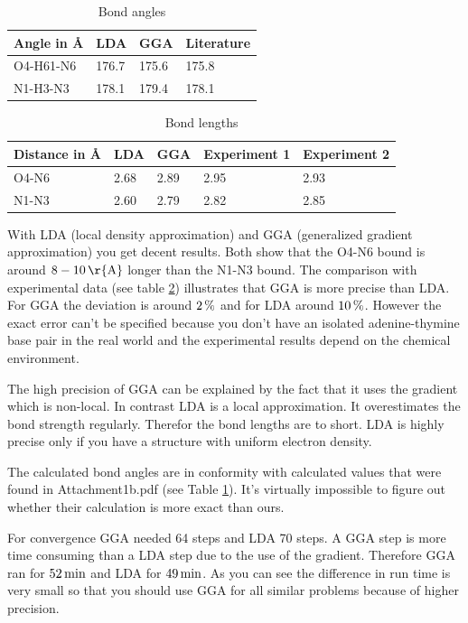 \documentclass[12pt,a4paper]{scrartcl}
\begin{document}
\begin{table}[H]
\begin{tabular}{l||l|l|l}
Angle in \r{A} & LDA & GGA & Literature \footnotemark[2]\\ 
\hline \hline 
O4-H61-N6 & 176.7 & 175.6 & 175.8\\ 
\hline 
N1-H3-N3 & 178.1 & 179.4 & 178.1\\ 
\end{tabular}
\caption{Bond angles}\label{tab:angles}
\end{table}

\begin{table}[H]
\begin{tabular}{l||l|l|l|l}
Distance in \r{A} & LDA & GGA & Experiment 1 \footnotemark[2] & Experiment 2 \footnotemark[2] \\ 
\hline \hline 
O4-N6 & 2.68 & 2.89 & 2.95 & 2.93 \\ 
\hline 
N1-N3 & 2.60 & 2.79 & 2.82 & 2.85 \\ 
\end{tabular}
\caption{Bond lengths}\label{tab:lengths}
\end{table}


With LDA (local density approximation) and GGA (generalized gradient approximation) you get decent results. Both show that the O4-N6 bound is around $\unit[8 - 10]{\r{A}}$ longer than the N1-N3 bound. The comparison with experimental data (see table \ref{tab:lengths}) illustrates that GGA is more precise than LDA. For GGA the deviation is around $\unit[2]{\%}$ and for LDA around $\unit[10]{\%}$. However the exact error can't be specified because you don't have an isolated adenine-thymine base pair in the real world and the experimental results depend on the chemical environment.

The high precision of GGA can be explained by the fact that it uses the gradient which is non-local. In contrast LDA is a local approximation. It overestimates the bond strength regularly. Therefor the bond lengths are to short. LDA is highly precise only if you have a structure with uniform electron density.

The calculated bond angles are in conformity with calculated values that were found in Attachment1b.pdf (see Table \ref{tab:angles}). It's virtually impossible to figure out whether their calculation is more exact than ours.

For convergence GGA needed 64 steps and LDA 70 steps. A GGA step is more time consuming than a LDA step due to the use of the gradient. Therefore GGA ran for $\unit[52]{min}$ and LDA for $\unit[49]{min}$. As you can see the difference in run time is very small so that you should use GGA for all similar problems because of higher precision.
\end{document}
